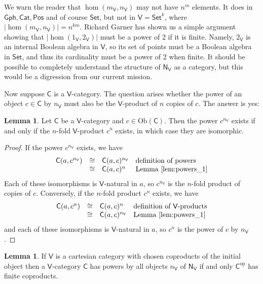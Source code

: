 \documentclass{amsart}
\theoremstyle{definition}
\newtheorem{lemma}[theorem]{Lemma}
\newcommand{\Gph}{\mathsf{Gph}}
\newcommand{\Set}{\mathsf{Set}}
\newcommand{\Cat}{\mathsf{Cat}}
\newcommand{\Pos}{\mathsf{Pos}}
\newcommand{\NN}{\mathsf{N}}
\newcommand{\V}{\mathsf{V}}
\newcommand{\C}{\mathsf{C}}
\newcommand{\op}{\mathrm{op}}
\newcommand{\Obj}{\mathrm{Ob}}
\begin{document}
We warn the reader that $\hom(m_\V,n_\V)$ may not have $n^m$ elements.  It does
in $\Gph,\Cat,\Pos$ and of course $\Set$, but not in $\V = \Set^k$, where
$|\hom(m_\V, n_\V)| = n^{km}$.   Richard Garner has shown us a simple 
argument showing that $|\hom(1_\V,2_\V)|$ must be a power of 2 if it is
finite.   Namely, $2_\V$ is an internal Boolean algebra in $\V$, so its set of 
points must be a Boolean algebra in $\Set$, and thus its cardinality must be a power
of 2 when finite.  It should be possible to completely understand the structure of
$\NN_\V$ as a category, but this would be a digression from our current mission.

Now suppose $\C$ is a $\V$-category.   The question arises whether the
power of an object $c \in \C$ by $n_\V$ must also be the $\V$-product of $n$ copies
of $c$.   The answer is yes:

\begin{lemma}
\label{lem:powers_2}
Let $\C$ be a $\V$-category and $c \in \Obj(\C)$.  Then the power $c^{n_\V}$ exists
if and only if the $n$-fold $\V$-product $c^n$ exists, in which case they are isomorphic.
\end{lemma}

\begin{proof}
If the power $c^{n_\V}$ exists, we have
\[    
\begin{array}{rcll}
	 \C(a,c^{n_\V}) &\cong& \C(a,c)^{n_\V} & \text{definition of powers} \\
	 &\cong & \C(a,c)^n & \text{Lemma \ref{lem:powers_1}} \\
\end{array}
\]
Each of these isomorphisms is 
$\V$-natural in $a$, so $c^{n_\V}$ is the $n$-fold product of copies of $c$.  Conversely,
if the $n$-fold product $c^n$ exists, we have
\[    
\begin{array}{rcll}
	 \C(a,c^n) &\cong& \C(a,c)^n & \text{definition of $\V$-products} \\
	 &\cong & \C(a,c)^{n_\V} & \text{Lemma \ref{lem:powers_1}} \\
\end{array}
\]
and each of these isomorphisms is 
$\V$-natural in $a$, so $c^n$ is the power of $c$ by $n_\V$.
\end{proof}

\iffalse
\begin{lemma}
If $\V$ is a cartesian category with chosen coproducts of the initial object then a
$\V$-category $\C$ has powers by all objects $n_\V$ of $\NN_\V$ if and only $\C^\op$
has finite coproducts.
\end{lemma}
\end{document}
